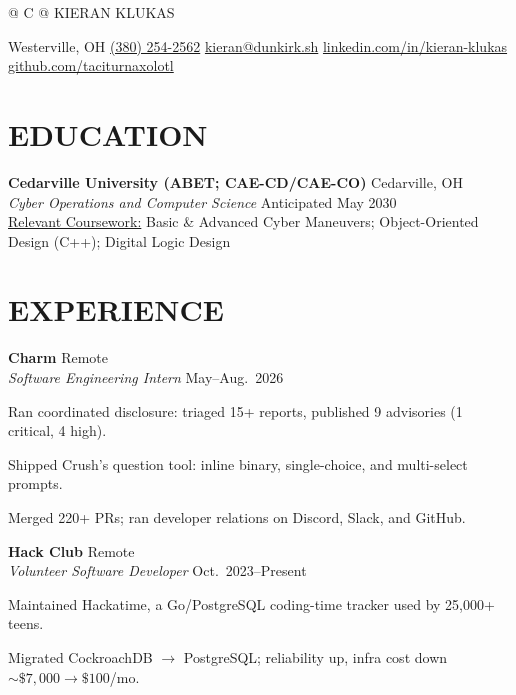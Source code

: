 \documentclass[a4paper,10pt]{article}
\makeatletter
\newlength{\mpwidth}
\newenvironment{orgblock}[2]{%
  \par\noindent\textbf{#1} \hfill #2\\%
}{\par\vspace{3pt}}
\newenvironment{subxp}[2]{%
  \noindent\textit{#1} \hfill #2\\%
  \begin{minipage}[t]{\mpwidth}%
    \begingroup
      \setlength{\leftskip}{0pt}\setlength{\parindent}{0pt}\setlength{\parskip}{0pt}
      \makeatletter
      \def\my@itemize{%
        \list{\labelitemi}{%
          \setlength{\leftmargin}{0.8em}%
          \setlength{\itemindent}{0pt}%
          \setlength{\labelsep}{0.6em}%
          \setlength{\labelwidth}{0pt}%
          \setlength{\parsep}{0pt}%
          \setlength{\topsep}{0pt}%
          \setlength{\partopsep}{0pt}%
          \setlength{\itemsep}{2pt}%
        }%
      }%
      \makeatother
      \renewcommand{\labelitemi}{\textendash}%
      \my@itemize
}{%
      \endlist
    \endgroup
  \end{minipage}%
  \par\vspace{2pt}%
}
\makeatother
\begin{document}
\pagestyle{empty}

\begin{tabularx}{\linewidth}{@{} C @{}}
\Huge{KIERAN KLUKAS} \\[6pt]
\raggedright
Westerville, OH \textbar{} \href{tel:+13802542562}{(380) 254-2562} \textbar{} \href{mailto:kieran@dunkirk.sh}{kieran@dunkirk.sh} \textbar{} \href{https://linkedin.com/in/kieran-klukas}{linkedin.com/in/kieran-klukas} \textbar{} \href{https://github.com/taciturnaxolotl}{github.com/taciturnaxolotl}
\end{tabularx}

\section{EDUCATION}
\textbf{Cedarville University (ABET; CAE-CD/CAE-CO)} \hfill Cedarville, OH\\
\textit{Cyber Operations and Computer Science} \hfill Anticipated May 2030\\
\underline{Relevant Coursework:} Basic \& Advanced Cyber Maneuvers; Object-Oriented Design (C++); Digital Logic Design

\section{EXPERIENCE}
\begin{orgblock}{Charm}{Remote}
  \begin{subxp}{Software Engineering Intern}{May--Aug.\ 2026}
    \item Ran coordinated disclosure: triaged 15+ reports, published 9 advisories (1 critical, 4 high).
    \item Shipped Crush's question tool: inline binary, single-choice, and multi-select prompts.
    \item Merged 220+ PRs; ran developer relations on Discord, Slack, and GitHub.
  \end{subxp}
\end{orgblock}

\begin{orgblock}{Hack Club}{Remote}
  \begin{subxp}{Volunteer Software Developer}{Oct.\ 2023--Present}
    \item Maintained Hackatime, a Go/PostgreSQL coding-time tracker used by 25{,}000+ teens.
    \item Migrated CockroachDB $\rightarrow$ PostgreSQL; reliability up, infra cost down $\sim\$7{,}000 \rightarrow \$100$/mo.
  \end{subxp}
\end{orgblock}
\end{document}
